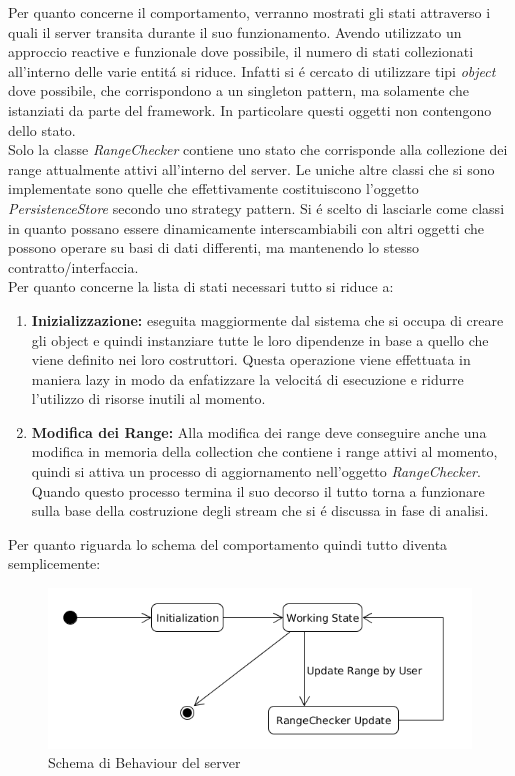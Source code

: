 Per quanto concerne il comportamento, verranno mostrati gli stati attraverso i quali il server transita durante il suo funzionamento. Avendo utilizzato un approccio reactive e funzionale dove possibile, il numero di stati collezionati all'interno delle varie entit\'a si riduce. Infatti si \'e cercato di utilizzare tipi \textit{object} dove possibile, che corrispondono a un singleton pattern, ma solamente che istanziati da parte del framework. In particolare questi oggetti non contengono dello stato.\\
Solo la classe \textit{RangeChecker} contiene uno stato che corrisponde alla collezione dei range attualmente attivi all'interno del server. Le uniche altre classi che si sono implementate sono quelle che effettivamente costituiscono l'oggetto \textit{PersistenceStore} secondo uno strategy pattern. Si \'e scelto di lasciarle come classi in quanto possano essere dinamicamente interscambiabili con altri oggetti che possono operare su basi di dati differenti, ma mantenendo lo stesso contratto/interfaccia.\\
Per quanto concerne la lista di stati necessari tutto si riduce a:
\begin{enumerate}
\item \textbf{Inizializzazione:} eseguita maggiormente dal sistema che si occupa di creare gli object e quindi instanziare tutte le loro dipendenze in base a quello che viene definito nei loro costruttori. Questa operazione viene effettuata in maniera lazy in modo da enfatizzare la velocit\'a di esecuzione e ridurre l'utilizzo di risorse inutili al momento.
  \item \textbf{Modifica dei Range:} Alla modifica dei range deve conseguire anche una modifica in memoria della collection che contiene i range attivi al momento, quindi si attiva un processo di aggiornamento nell'oggetto \textit{RangeChecker}. Quando questo processo termina il suo decorso il tutto torna a funzionare sulla base della costruzione degli stream che si \'e discussa in  fase di analisi.
\end{enumerate}

Per quanto riguarda lo schema del comportamento quindi tutto diventa semplicemente:

\begin{figure}[h]
\centering
\includegraphics[scale=0.5,natwidth=610,natheight=642]{Figures/Project/Server/Behaviour/DomoticRoomServerStateDiagram.png}
\caption{Schema di Behaviour del server}
\label{BehaviourServerSchema}
\end{figure}

